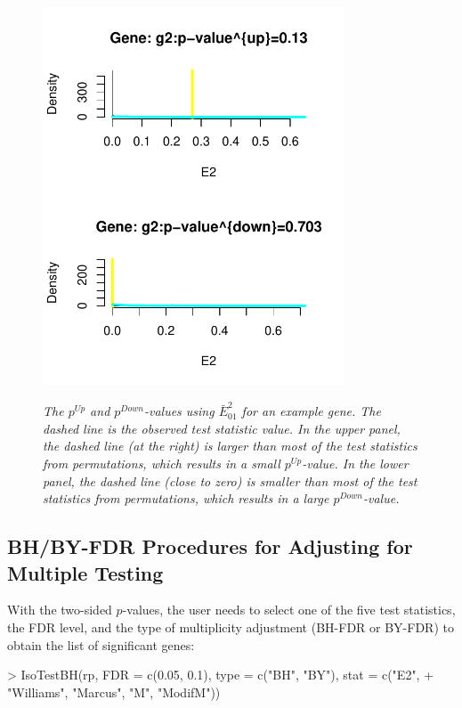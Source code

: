 \documentclass[10pt]{mybook4}
\begin{document}
  
\begin{figure}[!h]
\centering
{\includegraphics[width=0.8\textwidth]{IsoGene-IsopvaluePlot.pdf}}
\caption{\em{The $p^{Up}$ and $p^{Down}$-values using
$\bar{E}_{01}^2$ for an example gene. The dashed line is the
observed test statistic value. In the upper panel, the dashed line
(at the right) is larger than most of the test statistics from
permutations, which results in a small $p^{Up}$-value. In the lower
panel, the dashed line (close to zero) is smaller than most of the
test statistics from permutations, which results in a large
$p^{Down}$-value.}} \label{expvalue}
\end{figure}



\subsection{BH/BY-FDR Procedures for Adjusting for Multiple Testing}

With the two-sided $p$-values, the user needs to select one of the
five test statistics, the FDR level, and the type of multiplicity
adjustment (BH-FDR or BY-FDR) to obtain the list of significant
genes:

\begin{Schunk}
\begin{Sinput}
> IsoTestBH(rp, FDR = c(0.05, 0.1), type = c("BH", "BY"), stat = c("E2", 
+     "Williams", "Marcus", "M", "ModifM"))
\end{Sinput}
\end{Schunk}
\end{document}
